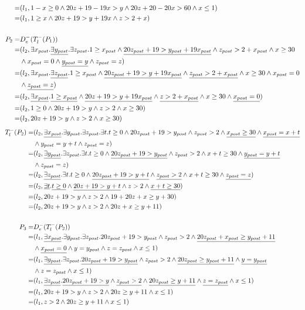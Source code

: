 \begin{align*}
=&(l_1,1-x\ge 0\wedge 20z+19-19x>y\wedge 20z+20-20x>60\wedge x\le 1)\\
=&(l_1,1\ge x\wedge 20z+19>y+19x\wedge z>2+x)\\
\\
P_2=&D_e^-(T_l^-(P_1))\\
=&(l_2,\exists x_{post}.\underline{\exists y_{post}}.\exists z_{post}.1\ge x_{post}\wedge\underline{20z_{post}+19>y_{post}+19x_{post}}\wedge z_{post}>2+x_{post}\wedge x\ge 30\\&\wedge x_{post}=0\wedge\underline{y_{post}=y}\wedge z_{post}=z)\\
=&(l_2,\exists x_{post}.\underline{\exists z_{post}}.1\ge x_{post}\wedge\underline{20z_{post}+19>y+19x_{post}}\wedge\underline{z_{post}>2+x_{post}}\wedge x\ge 30\wedge x_{post}=0\\&\wedge\underline{z_{post}=z})\\
=&(l_2,\underline{\exists x_{post}}.\underline{1\ge x_{post}}\wedge\underline{20z+19>y+19x_{post}}\wedge\underline{z>2+x_{post}}\wedge x\ge 30\wedge\underline{x_{post}=0})\\
=&(l_2,1\ge 0\wedge 20z+19>y\wedge z>2\wedge x\ge 30)\\
=&(l_2,20z+19>y\wedge z>2\wedge x\ge 30)\\
\end{align*}
\begin{align*}
T_l^-(P_2)=&(l_2,\underline{\exists x_{post}}.\exists y_{post}.\exists z_{post}.\exists t.t\ge 0\wedge 20z_{post}+19>y_{post}\wedge z_{post}>2\wedge\underline{x_{post}\ge 30}\wedge\underline{x_{post}=x+t}\\&\wedge y_{post}=y+t\wedge z_{post}=z)\\
=&(l_2,\underline{\exists y_{post}}.\exists z_{post}.\exists t.t\ge 0\wedge\underline{20z_{post}+19>y_{post}}\wedge z_{post}>2\wedge x+t\ge 30\wedge\underline{y_{post}=y+t}\\&\wedge z_{post}=z)\\
=&(l_2,\underline{\exists z_{post}}.\exists t.t\ge 0\wedge\underline{20z_{post}+19>y+t}\wedge\underline{z_{post}>2}\wedge x+t\ge 30\wedge\underline{z_{post}=z})\\
=&(l_2,\underline{\exists t}.\underline{t\ge 0}\wedge\underline{20z+19>y+t}\wedge z>2\wedge\underline{x+t\ge 30})\\
=&(l_2,20z+19>y\wedge z>2\wedge 19+20z+x\ge y+30)\\
=&(l_2,20z+19>y\wedge z>2\wedge 20z+x\ge y+11)\\
\\
P_3=&D_e^-(T_l^-(P_2))\\
=&(l_1,\underline{\exists x_{post}}.\exists y_{post}.\exists z_{post}.20z_{post}+19>y_{post}\wedge z_{post}>2\wedge\underline{20z_{post}+x_{post}\ge y_{post}+11}\\&\wedge\underline{x_{post}=0}\wedge y=y_{post}\wedge z=z_{post}\wedge x\le 1)\\
=&(l_1,\underline{\exists y_{post}}.\exists z_{post}.\underline{20z_{post}+19>y_{post}}\wedge z_{post}>2\wedge\underline{20z_{post}\ge y_{post}+11}\wedge\underline{y=y_{post}}\\&\wedge z=z_{post}\wedge x\le 1)\\
=&(l_1,\underline{\exists z_{post}}.\underline{20z_{post}+19>y}\wedge\underline{z_{post}>2}\wedge\underline{20z_{post}\ge y+11}\wedge\underline{z=z_{post}}\wedge x\le 1)\\
=&(l_1,20z+19>y\wedge z>2\wedge 20z\ge y+11\wedge x\le 1)\\
=&(l_1,z>2\wedge 20z\ge y+11\wedge x\le 1)\\
\end{align*}
\newpage